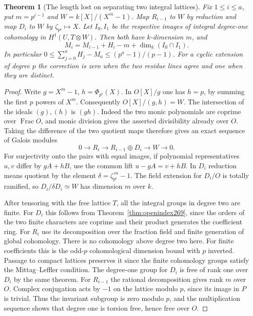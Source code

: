 \documentclass[a4paper,11pt]{article}
\newtheorem{theorem}[proposition]{Theorem}
\theoremstyle{definition}
\theoremstyle{remark}
\numberwithin{equation}{section}
\begin{document}
\begin{theorem}[The length lost on separating two integral lattices]\leavevmode
\label{thm:intersection279}
Fix \(1\le i\le a\), put \(m=p^{i-1}\) and
\(W=k[X]/(X^m-1)\). Map \(R_{i-1}\) to \(W\) by reduction
and map \(D_i\) to \(W\) by \(\zeta_{p^i}\mapsto X\).
Let \(I_0,I_1\) be the respective images of integral
degree-one cohomology in \(H^1(U,T\otimes W)\).
Then both have \(k\)-dimension \(m\), and
\[
       M_i=M_{i-1}+H_i-m+\dim_k(I_0\cap I_1).
\]
In particular \(0\le \sum_{j=0}^aH_j-M_a\le(p^a-1)/(p-1)\).
For a cyclic extension of degree \(p\) the correction is zero
when the two residue lines agree and one when they are distinct.
\end{theorem}
\begin{proof}
Write \(g=X^m-1\), \(h=\Phi_{p^i}(X)\). In \(O[X]/g\) one has
\(h=p\), by summing the first \(p\) powers of \(X^m\).
Consequently \(O[X]/(g,h)=W\). The intersection of the ideals
\((g),(h)\) is \((gh)\). Indeed the two monic polynomials are
coprime over \(\operatorname{Frac}O\), and monic division gives
the asserted divisibility already over \(O\).
Taking the difference of the two quotient maps therefore gives
an exact sequence of Galois modules
\[
 0\longrightarrow R_i\longrightarrow R_{i-1}\oplus D_i
                \longrightarrow W\longrightarrow0 .
\]
For surjectivity onto the pairs with equal images, if polynomial
representatives \(u,v\) differ by \(gA+hB\), use the common lift
\(u-gA=v+hB\). In \(D_i\) reduction means quotient by the
element \(\delta=\zeta_{p^i}^{\,m}-1\). The field extension for
\(D_i/O\) is totally ramified, so \(D_i/\delta D_i\simeq W\)
has dimension \(m\) over \(k\).

After tensoring with the free lattice \(T\), all the integral
groups in degree two are finite. For \(D_i\) this follows from
Theorem~\ref{thm:openindex269}, since the orders of the two
finite characters are coprime and their product generates the
coefficient ring. For \(R_i\) use its decomposition over the
fraction field and finite generation of global cohomology.
There is no cohomology above degree two here. For finite
coefficients this is the odd-\(p\) cohomological dimension
bound with \(p\) inverted. Passage to compact lattices preserves
it since the finite cohomology groups satisfy the
Mittag--Leffler condition. The degree-one group for \(D_i\)
is free of rank one over \(D_i\) by the same theorem.
For \(R_{i-1}\) the rational decomposition gives rank \(m\)
over \(O\). Complex conjugation acts by \(-1\) on the lattice
modulo \(p\), since its image in \(P\) is trivial. Thus the
invariant subgroup is zero modulo \(p\), and the multiplication
sequence shows that degree one is torsion free, hence free over
\(O\).


\end{proof}
\end{document}
